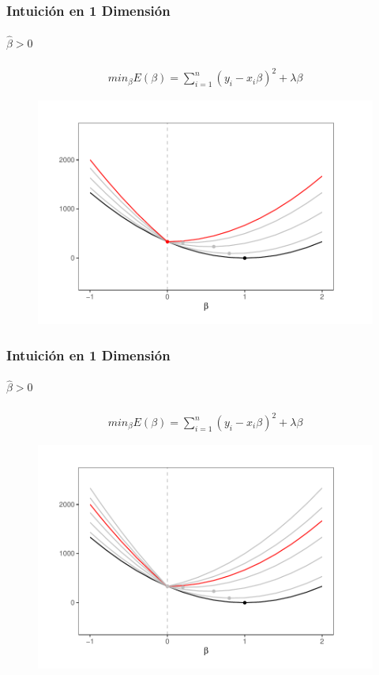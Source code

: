 \documentclass[
  shownotes,
  xcolor={svgnames},
  hyperref={colorlinks,citecolor=DarkBlue,linkcolor=andesred,urlcolor=DarkBlue}
  , aspectratio=169]{beamer}
\begin{document}
\begin{frame}[fragile]
\frametitle{Intuición en 1 Dimensión}
\framesubtitle{ $\hat{\beta}>0$}
\footnotesize
\begin{align}
 min_{\beta} E(\beta) = \sum_{i=1}^n (y_i-x_i \beta)^2 + \lambda \beta 
\end{align}

   \begin{figure}[H] \centering
            \captionsetup{justification=centering}
              \includegraphics[scale=0.6]{figures/lasso6.pdf}
 \end{figure}


\end{frame}
\begin{frame}[fragile]
\frametitle{Intuición en 1 Dimensión}
\framesubtitle{ $\hat{\beta}>0$}
\footnotesize
\begin{align}
 min_{\beta} E(\beta) = \sum_{i=1}^n (y_i-x_i \beta)^2 + \lambda \beta 
\end{align}

   \begin{figure}[H] \centering
            \captionsetup{justification=centering}
              \includegraphics[scale=0.6]{figures/lasso_final.pdf}
 \end{figure}

 \end{frame}
\end{document}
